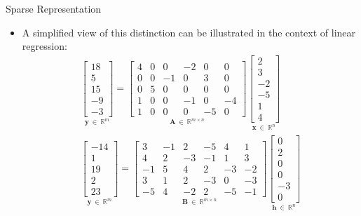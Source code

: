 \documentclass[10pt]{beamer}
\begin{document}
	\begin{frame}{Sparse Representation}
		\begin{itemize}
			\item A simplified view of this distinction can be illustrated in the context of linear regression:
			\pause
			\begin{align*}
			\underset{\bm{y} ~\in~ \mathbb{R}^m}{
				\begin{bmatrix}
				18 \\  5 \\ 15 \\ -9 \\ -3
				\end{bmatrix}} = 
			\underset{\mathbf{A} ~\in~ \mathbb{R}^{m \times n}}{
				\begin{bmatrix}
				4 & 0 & 0 & -2 & 0 & 0 \\
				0 & 0 & -1 & 0 & 3 & 0 \\
				0 & 5 & 0 & 0 & 0 & 0 \\
				1 & 0 & 0 & -1 & 0 & -4 \\
				1 & 0 & 0 & 0 & -5 & 0
				\end{bmatrix}} 
			\underset{\bm{x} ~\in~ \mathbb{R}^n}{
				\begin{bmatrix}
				2 \\ 3\\ -2\\ -5 \\ 1 \\ 4
				\end{bmatrix} }\\
			\underset{\bm{y} ~\in~ \mathbb{R}^m}{
				\begin{bmatrix}
				-14 \\  1 \\ 19 \\  2 \\ 23
				\end{bmatrix}} = 
			\underset{\mathbf{B} ~\in~ \mathbb{R}^{m \times n}}{
				\begin{bmatrix}
				3 & -1 & 2 & -5 & 4 & 1 \\
				4 & 2 & -3 & -1 & 1 & 3 \\
				-1 & 5 & 4 & 2 & -3 & -2 \\
				3 & 1 & 2 & -3 & 0 & -3 \\
				-5 & 4 & -2 & 2 & -5 & -1
				\end{bmatrix}} 
			\underset{\bm{h} ~\in~ \mathbb{R}^n}{
				\begin{bmatrix}
				0 \\ 2 \\ 0 \\ 0 \\ -3 \\ 0
				\end{bmatrix} }
			\end{align*}
		\end{itemize}
	\end{frame}
	
\end{document}
